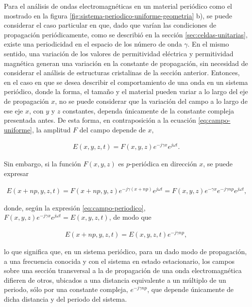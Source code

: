 Para el análisis de ondas electromagnéticas en un material periódico como el mostrado en la figura \ref{fig:sistema-periodico-uniforme-geometria} b), se puede considerar el caso particular en que, dado que varían las condiciones de propagación periódicamente, como se describió en la sección \ref{sec:celdas-unitarias}, existe una periodicidad en el espacio de los número de onda $\gamma$. En el mismo sentido, una variación de los valores de permitividad eléctrica y permitividad magnética generan una variación en la constante de propagación, sin necesidad de considerar el análisis de estructuras cristalinas de la sección anterior. Entonces, en el caso en que se desea describir el comportamiento de una onda en un sistema periódico, donde la forma, el tamaño y el material pueden variar a lo largo del eje de propagación $x$, no se puede considerar que la variación del campo a lo largo de ese eje $x$, con $y$ y $z$ constantes, dependa únicamente de la constante compleja presentada antes. De esta forma, en contraposición a la ecuación \ref{eq:campo-uniforme}, la amplitud $F$ del campo depende de $x$,

\begin{align}
	\label{eq:campo-periodico}
	E(x,y,z,t) = F(x,y,z) e^{-j\gamma x} e^{j\omega t}.
\end{align}

Sin embargo, si la función $F(x,y,z)$ es $p$-periódica en dirección $x$, se puede expresar

\begin{align}
E(x+np,y,z,t) = F(x+np,y,z) e^{-j\gamma (x+np)} e^{j\omega t} = F(x,y,z)  e^{-\gamma x}e^{-j\gamma np} e^{j\omega t},
\end{align}

donde, según la expresión \ref{eq:campo-periodico}, $F(x,y,z)  e^{-j\gamma x} e^{j\omega t} = E(x,y,z,t)$, de modo que

\begin{align}
	\label{eq:e-periodico}
	E(x+np,y,z,t) = E(x,y,z,t) e^{-j\gamma np},
\end{align}

lo que significa que, en un sistema periódico, para un dado modo de propagación, a una frecuencia conocida y con el sistema en estado estacionario, los campos sobre una sección transversal a la de propagación de una onda electromagnética difieren de otros, ubicados a una distancia equivalente a un múltiplo de un periodo, sólo por una constante compleja,  $e^{-j\gamma np}$, que depende únicamente de dicha distancia y del periodo del sistema.

